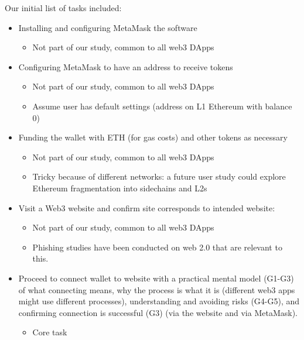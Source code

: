 \documentclass[conference]{IEEEtran}
\begin{document}
\vspace{1em}
\noindent
Our initial list of tasks included:
\begin{itemize}
	\item Installing and configuring MetaMask the software
		\begin{itemize}
			\item Not part of our study, common to all web3 DApps
		\end{itemize}

	\item Configuring MetaMask to have an address to receive tokens
		\begin{itemize}
  			\item Not part of our study, common to all web3 DApps
  			\item Assume user has default settings (address on L1 Ethereum with balance 0)
		\end{itemize}

	\item Funding the wallet with ETH (for gas costs) and other tokens as necessary
		\begin{itemize}
  			\item Not part of our study, common to all web3 DApps
  			\item Tricky because of different networks: a future user study could explore Ethereum fragmentation into sidechains and L2s
		\end{itemize}

	\item Visit a Web3 website and confirm site corresponds to intended website:
		\begin{itemize}
  			\item Not part of our study, common to all web3 DApps
  			\item Phishing studies have been conducted on web 2.0 that are relevant to this. 
		\end{itemize}

	\item Proceed to connect wallet to website with a practical mental model (G1-G3) of what connecting means, why the process is what it is (different web3 apps might use different processes), understanding and avoiding risks (G4-G5), and confirming connection is successful (G3) (via the website and via MetaMask).
		\begin{itemize}
  			\item Core task
		\end{itemize}


\end{itemize}
\end{document}
